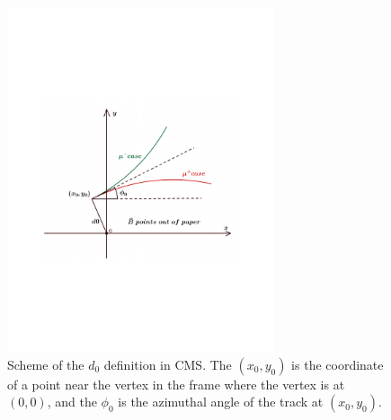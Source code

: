 \begin{figure}[!htb]
      \centering
      \includegraphics[width=0.70\textwidth]{pics/muon_corr/GeoFit/d0_def.pdf}
      \caption{Scheme of the $d_0$ definition in CMS. The $(x_{0}, y_{0})$ is the coordinate of 
               a point near the vertex in the frame where the vertex is at $(0,0)$, 
               and the $\phi_{0}$ is the azimuthal angle of the track at $(x_{0}, y_{0})$.}
      \label{fig:d0_def}
\end{figure}

